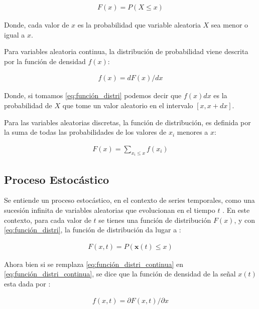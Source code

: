 \begin{eqnarray}\label{eq:función_distri}
    {F(x)=P(X \leq x)}
\end{eqnarray}

Donde, cada valor de $x$ es la probabilidad que variable aleatoria $X$ sea menor o igual a $x$.

Para variables aleatoria continua, la distribución de probabilidad viene descrita por la función de densidad
${f(x)}$: 

 \begin{eqnarray}\label{eq:función_distri_continua}
    {f(x)= dF(x)/dx} 
\end{eqnarray}

Donde, si tomamos \ref{eq:función_distri} podemos decir que  $f(x)dx$ es la probabilidad de $X$ que tome un valor aleatorio en el intervalo $[x, x+dx]$.

Para las variables aleatorias discretas, la función de distribución, es definida por la suma de todas las probabilidades de los valores de $x_i$  menores a $x$:

\begin{eqnarray}\label{eq:función_distri_discreta}
    {F(x)= \displaystyle\sum_{x_i \leq x }f(x_i)}
\end{eqnarray}

\subsection{Proceso Estocástico}\label{subs:proceso_estocástico}

Se entiende un proceso estocástico, en el contexto de series temporales, como una sucesión infinita de variables aleatorias que evolucionan en el tiempo $t$  \cite{Papoulis91}. En este contexto,  para cada valor de $t$ se tienes una función de distribución $F(x)$, y con \ref{eq:función_distri}, la función de distribución da lugar a :

\begin{eqnarray}\label{eq:función_distri_procesoe}
   {F(x,t)=P(\mathbf{x}(t) \leq x)}
\end{eqnarray}

Ahora bien si se remplaza \ref{eq:función_distri_continua} en \ref{eq:función_distri_continua}, se dice que la función de densidad de la señal $x(t)$ esta dada por :

\begin{eqnarray}\label{eq:función_distri_procesoe}
f(x,t)= \partial{F(x,t)}/\partial{x}
\end{eqnarray}


